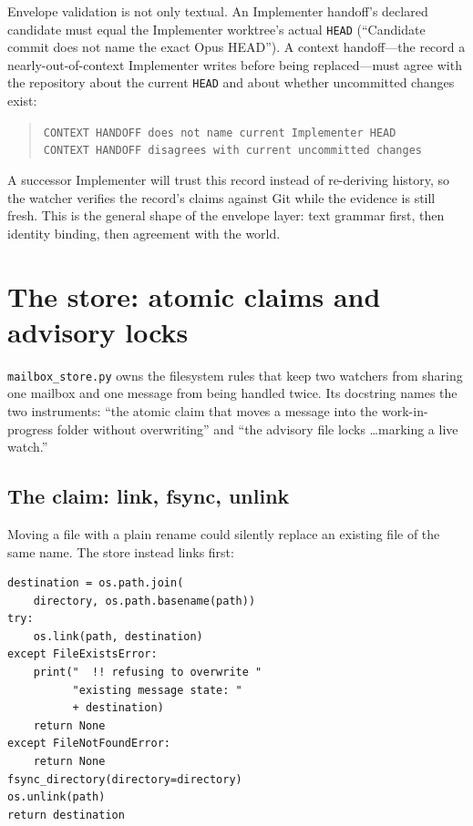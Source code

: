 \documentclass[10pt,aps,prd,twocolumn,nofootinbib]{revtex4-2}
\newcommand{\code}[1]{\texttt{#1}}
\newcommand{\file}[1]{\texttt{#1}}
\begin{document}
Envelope validation is not only textual.  An Implementer handoff's
declared candidate must equal the Implementer worktree's actual
\code{HEAD} (``Candidate commit does not name the exact Opus HEAD'').
A context handoff---the record a nearly-out-of-context Implementer
writes before being replaced---must agree with the repository about
the current \code{HEAD} and about whether uncommitted changes exist:

\begin{quote}\small
\code{CONTEXT HANDOFF does not name current Implementer HEAD}\\
\code{CONTEXT HANDOFF disagrees with current uncommitted changes}
\end{quote}

A successor Implementer will trust this record instead of re-deriving
history, so the watcher verifies the record's claims against Git while
the evidence is still fresh.  This is the general shape of the
envelope layer: text grammar first, then identity binding, then
agreement with the world.

\section{The store: atomic claims and advisory locks}
\label{sec:store}

\file{mailbox\_store.py} owns the filesystem rules that keep two
watchers from sharing one mailbox and one message from being handled
twice.  Its docstring names the two instruments: ``the atomic claim
that moves a message into the work-in-progress folder without
overwriting'' and ``the advisory file locks \dots marking a live
watch.''

\subsection{The claim: link, fsync, unlink}

Moving a file with a plain rename could silently replace an existing
file of the same name.  The store instead links first:

\begin{verbatim}
destination = os.path.join(
    directory, os.path.basename(path))
try:
    os.link(path, destination)
except FileExistsError:
    print("  !! refusing to overwrite "
          "existing message state: "
          + destination)
    return None
except FileNotFoundError:
    return None
fsync_directory(directory=directory)
os.unlink(path)
return destination
\end{verbatim}
\end{document}
